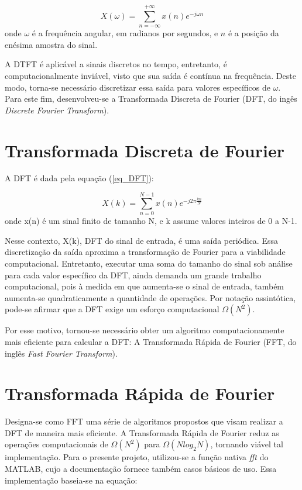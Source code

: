 \begin{equation} \label{eq_DTFT}
	X(\omega) = \sum_{n=-\infty}^{+\infty}x(n)e^{-j\omega n}
\end{equation}
onde $\omega$ é a frequência angular, em radianos por segundos, e $n$ é a posição da enésima amostra do sinal.


A DTFT é aplicável a sinais discretos no tempo, entretanto, é computacionalmente inviável, visto que sua saída é contínua na frequência. Deste modo, torna-se necessário discretizar essa saída para valores específicos de $\omega$. Para este fim, desenvolveu-se a Transformada Discreta de Fourier (DFT, do ingês \textit{Discrete Fourier Transform}).


\section{Transformada Discreta de Fourier}


A DFT é dada pela equação (\ref{eq_DFT}):

\begin{equation} \label{eq_DFT}
	X(k) = \sum_{n=0}^{N-1}x(n)e^{-j2\pi \frac{kn}{N}}
\end{equation}
onde x(n) é um sinal finito de tamanho N, e k assume valores inteiros de 0 a N-1.


Nesse contexto, X(k), DFT do sinal de entrada, é uma saída periódica. Essa discretização da saída aproxima a transformação de Fourier para a viabilidade computacional. Entretanto, executar uma soma do tamanho do sinal sob análise para cada valor específico da DFT,  ainda demanda um grande trabalho computacional, pois à medida em que aumenta-se o sinal de entrada, também aumenta-se quadraticamente a quantidade de operações. Por notação assintótica, pode-se afirmar que a DFT exige um esforço computacional $\Omega(N^2)$.


Por esse motivo, tornou-se necessário obter um algoritmo computacionamente mais eficiente para calcular a DFT: A Transformada Rápida de Fourier (FFT, do inglês \textit{Fast Fourier Transform}).


\section{Transformada Rápida de Fourier}

Designa-se como FFT uma série de algoritmos propostos que visam realizar a DFT de maneira mais eficiente. A Transformada Rápida de Fourier reduz as operações computacionais de $\Omega(N^2)$ para $\Omega( N log_2 N)$, tornando viável tal implementação. Para o presente projeto, utilizou-se a função nativa \textit{fft} do MATLAB\rreg, cujo a documentação fornece também casos básicos de uso\cite{mathworks2018}. Essa implementação baseia-se na equação:

